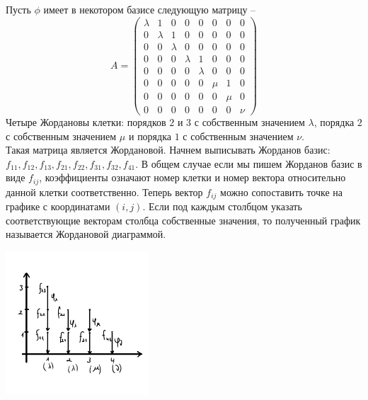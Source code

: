 \begin{example}
    Пусть $\phi$ имеет в некотором базисе следующую матрицу -- 
        \[A = \begin{pmatrix}
        \lambda & 1        & 0       & 0       & 0        & 0    &0    & 0\\
        0       & \lambda  & 1       & 0       & 0        & 0    &0    & 0\\
        0       & 0        & \lambda & 0       & 0        & 0    &0    & 0\\
        0       & 0        & 0       & \lambda & 1        & 0    &0    & 0\\
        0       & 0        & 0       & 0       & \lambda  & 0    &0    & 0\\
        0       & 0        & 0       & 0       & 0        & \mu  &1    & 0\\
        0       & 0        & 0       & 0       & 0        & 0    &\mu  & 0\\
        0       & 0        & 0       & 0       & 0        & 0    &0    & \nu
        \end{pmatrix}\]
    Четыре Жордановы клетки: порядков $2$ и $3$ с собственным значением $\lambda$, порядка $2$ с собственным значением $\mu$ и порядка $1$ с собственным значением $\nu$. \\ Такая матрица является Жордановой. Начнем выписывать Жорданов базис: $f_{11}, f_{12}, f_{13}, f_{21}, f_{22}, f_{31}, f_{32}, f_{41}$.
    В общем случае если мы пишем Жорданов базис в виде $f_{ij}$, коэффициенты означают номер клетки и 
    номер вектора относительно данной клетки соответственно. Теперь вектор $f_{ij}$ можно сопоставить 
    точке на графике с координатами $(i, j)$. Если под каждым столбцом указать соответствующие векторам столбца собственные значения, то полученный график называется Жордановой диаграммой.
    \begin{center}
        \includegraphics[width = 0.4\textwidth]{images/lec6_1.PNG}
    \end{center}
\end{example}

